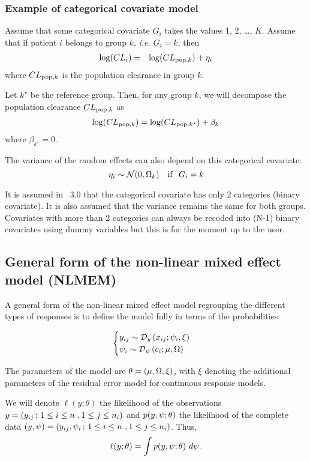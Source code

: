 \subsubsection{Example of categorical covariate model} \label{section_model_catcov}
Assume that some categorical covariate  $G_i$ takes the values 1, 2, \ldots, $K$.
Assume that if patient $i$ belongs to group $k$, {\it i.e.} $G_i=k$, then
\begin{eqnarray*}
\log(CL_i) &=&  \log(CL_{{\rm pop},k}) + \eta_i
\end{eqnarray*}
where $CL_{{\rm pop},k}$ is the population clearance in group $k$.

Let $k^\star$ be the reference group. Then, for any group $k$, we will decompose the population clearance $CL_{{\rm pop},k}$ as
\begin{eqnarray*}
\log(CL_{{\rm pop},k}) = \log(CL_{{\rm pop},k^\star}) + \beta_k
\end{eqnarray*}
where $\beta_{k^\star} = 0$.

The variance of the random effects can also depend on this categorical covariate:
$$ {\eta_i} \sim \mathcal{N}(0, {\Omega}_k) \ \ \ {\rm if } \ \ G_i=k $$

 It is assumed in \saemix~3.0 that the categorical covariate has only 2 categories (binary covariate). It is also assumed that the variance remains the same for both groups. Covariates with more than 2 categories can always be recoded into (N-1) binary covariates using dummy variables but this is for the moment up to the user.

\subsection{General form of the non-linear mixed effect model (NLMEM)}

A general form of the non-linear mixed effect model regrouping the different types of responses is to define the model fully in terms of the probabilities:

$$\begin{cases} 
 y_{ij}  \sim \mathcal{D}_y\left(x_{ij}; \psi_i, \xi \right) \\ 
 \psi_i \sim \mathcal{D}_\psi \left( c_i; \fixed_effect,\IIV \right)
\end{cases}$$

The parameters of the model are $\thetag=(\fixed_effect,\IIV,\xi)$, with $\xi$ denoting the additional parameters of the residual error model for continuous response models.

We will denote $\ell(y;\theta)$ the likelihood of the observations $y =(y_{ij} \, ; \, 1  \leq i \leq n \ , 1
\leq j \leq n_i)$ and $p(y,\psi;\theta) $ the likelihood of the complete data $(y,\psi)= (y_{ij}, \psi_i \, ; \, 1
\leq i \leq n \ , 1 \leq j \leq n_i)$. Thus, $$\ell(y;\theta) = \int p(\yg,\psig;\theta)  \ d\psig .$$
